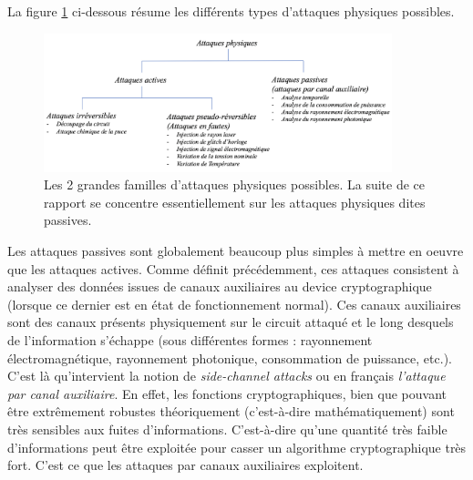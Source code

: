 \documentclass[10pt, oneside, a4paper]{article}
\begin{document}
\vspace{-0.1 cm}La figure \ref{fig:attaques} ci-dessous résume les différents types d'attaques physiques possibles.
\begin{figure}[htbp]
    \centering
    \includegraphics[width=0.9\textwidth]{image/attaques}
    \caption{Les 2 grandes familles d'attaques physiques possibles. La suite de ce rapport se concentre essentiellement sur les attaques physiques dites passives.}
    \label{fig:attaques}
\end{figure}

\vspace{-0.2 cm}Les attaques passives sont globalement beaucoup plus simples à mettre en oeuvre que les attaques actives. Comme définit précédemment, ces attaques consistent à analyser des données issues de canaux auxiliaires au device cryptographique (lorsque ce dernier est en état de fonctionnement normal). Ces canaux auxiliaires sont des canaux présents physiquement sur le circuit attaqué et le long desquels de l’information s’échappe (sous différentes formes : rayonnement électromagnétique, rayonnement photonique, consommation de puissance, etc.). C'est là qu'intervient la notion de \textit{side-channel attacks} ou en français \textit{l'attaque par canal auxiliaire}. 
En effet, les fonctions cryptographiques, bien que pouvant être extrêmement robustes théoriquement (c'est-à-dire mathématiquement) sont très sensibles aux fuites d’informations. C'est-à-dire qu'une quantité très faible d’informations peut être exploitée pour casser un algorithme cryptographique très fort. C’est ce que les attaques par canaux auxiliaires exploitent. 
\end{document}
